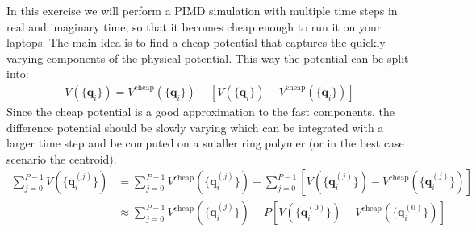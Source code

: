 \documentclass{article}
\begin{document}
\begin{Exercise}[label={water},title={Multiple time steps with an \emph{ab initio} potential}]
In this exercise we will perform a PIMD simulation  with multiple time steps in real and imaginary time, so that it becomes cheap enough to run it on your laptops. The main idea is to find a cheap potential that captures the quickly-varying components of the physical potential. This way the potential can be split into:
\begin{align*}
    V(\{\textbf{q}_i\}) = V^{\text{cheap}}(\{\textbf{q}_i\}) + [V(\{\textbf{q}_i\}) - V^{\text{cheap}}(\{\textbf{q}_i\})]
\end{align*}
Since the cheap potential is a good approximation to the fast components, the difference potential should be slowly varying which can be integrated with a larger time step and be computed on a smaller ring polymer (or in the best case scenario the centroid).
\begin{align*}
    \sum_{j=0}^{P-1} V(\{\textbf{q}_i^{(j)}\}) & = \sum_{j=0}^{P-1} V^{\text{cheap}}(\{\textbf{q}_i^{(j)}\}) + \sum_{j=0}^{P-1} [V(\{\textbf{q}_i^{(j)}\}) - V^{\text{cheap}}(\{\textbf{q}_i^{(j)}\})] \\
    & \approx \sum_{j=0}^{P-1} V^{\text{cheap}}(\{\textbf{q}_i^{(j)}\}) +  P [V(\{\textbf{q}_i^{(0)}\}) - V^{\text{cheap}}(\{\textbf{q}_i^{(0)}\})]
\end{align*}


\end{Exercise}
\end{document}
